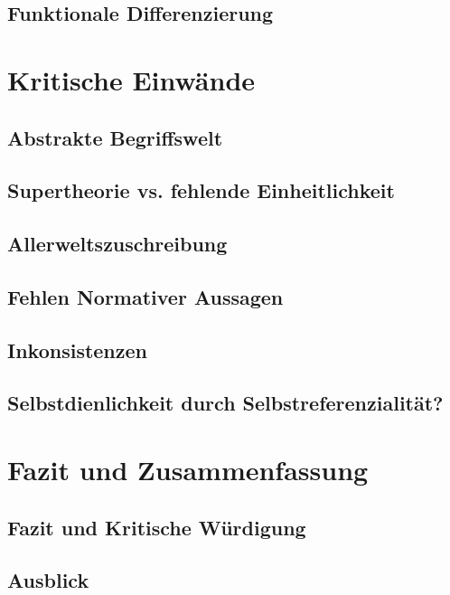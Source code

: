 \documentclass[a4paper,12pt]{article}
\begin{document}
\subsection{Funktionale Differenzierung}

\section{Kritische Einwände}
\subsection{Abstrakte Begriffswelt}
\subsection{Supertheorie vs. fehlende Einheitlichkeit}
\subsection{Allerweltszuschreibung}
\subsection{Fehlen Normativer Aussagen}
\subsection{Inkonsistenzen}
\subsection{Selbstdienlichkeit durch Selbstreferenzialität?}
\newpage

\section{Fazit und Zusammenfassung}
\subsection{Fazit und Kritische Würdigung}
\subsection{Ausblick}


\newpage

\nocite{*}
\printbibliography
% 
%
\end{document}
